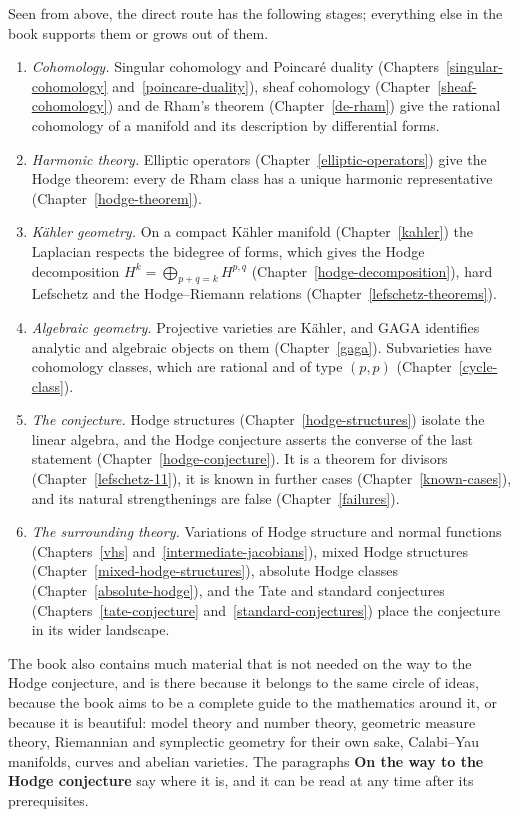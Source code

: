 Seen from above, the direct route has the following stages; everything else in the book supports them or grows out of them.
\begin{enumerate}
\item \emph{Cohomology.} Singular cohomology and Poincar\'e duality
(Chapters~\ref{singular-cohomology} and~\ref{poincare-duality}), sheaf
cohomology (Chapter~\ref{sheaf-cohomology}) and de Rham's theorem
(Chapter~\ref{de-rham}) give the rational cohomology of a manifold and its
description by differential forms.
\item \emph{Harmonic theory.} Elliptic operators
(Chapter~\ref{elliptic-operators}) give the Hodge theorem: every de Rham class
has a unique harmonic representative (Chapter~\ref{hodge-theorem}).
\item \emph{K\"ahler geometry.} On a compact K\"ahler manifold
(Chapter~\ref{kahler}) the Laplacian respects the bidegree of forms, which gives
the Hodge decomposition $H^k = \bigoplus_{p+q=k}H^{p,q}$
(Chapter~\ref{hodge-decomposition}), hard Lefschetz and the Hodge--Riemann
relations (Chapter~\ref{lefschetz-theorems}).
\item \emph{Algebraic geometry.} Projective varieties are K\"ahler, and GAGA
identifies analytic and algebraic objects on them (Chapter~\ref{gaga}).
Subvarieties have cohomology classes, which are rational and of type $(p,p)$
(Chapter~\ref{cycle-class}).
\item \emph{The conjecture.} Hodge structures (Chapter~\ref{hodge-structures})
isolate the linear algebra, and the Hodge conjecture asserts the converse of
the last statement (Chapter~\ref{hodge-conjecture}). It is a theorem for
divisors (Chapter~\ref{lefschetz-11}), it is known in further cases
(Chapter~\ref{known-cases}), and its natural strengthenings are false
(Chapter~\ref{failures}).
\item \emph{The surrounding theory.} Variations of Hodge structure and normal
functions (Chapters~\ref{vhs} and~\ref{intermediate-jacobians}), mixed Hodge
structures (Chapter~\ref{mixed-hodge-structures}), absolute Hodge classes
(Chapter~\ref{absolute-hodge}), and the Tate and standard conjectures
(Chapters~\ref{tate-conjecture} and~\ref{standard-conjectures}) place the
conjecture in its wider landscape.
\end{enumerate}

\begin{remark}\label{introduction:remark-first-reading}
The book also contains much material that is not needed on the way to the Hodge conjecture, and is there because it belongs to the same circle of ideas, because the book
aims to be a complete guide to the mathematics around it, or because it is beautiful: model theory and number theory, geometric measure theory, Riemannian and symplectic geometry
for their own sake, Calabi--Yau manifolds, curves and abelian varieties. The paragraphs \textbf{On the way to the Hodge conjecture} say where it is, and it can be read at any
time after its prerequisites.
\end{remark}

